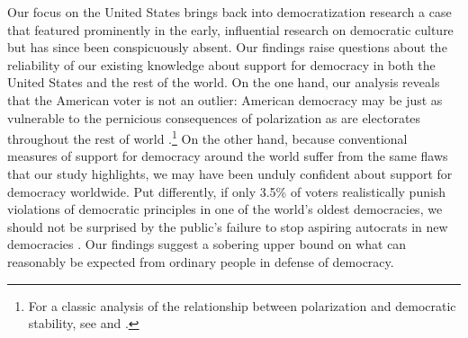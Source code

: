 \documentclass[letterpaper, 12pt]{article}
\begin{document}
\begin{raggedright}
Our focus on the United States brings back into democratization research a case that featured prominently in the early, influential research on democratic culture \citep{Almond1963,Dahl1966} but has since been conspicuously absent. Our findings raise questions about the reliability of our existing knowledge about support for democracy in both the United States and the rest of the world. On the one hand, our analysis reveals that the American voter is not an outlier: American democracy may be just as vulnerable to the pernicious consequences of polarization as are electorates throughout the rest of world \citep{McCoySomer2019,Svolik2019}.\footnote{For a classic analysis of the relationship between polarization and democratic stability, see \citet{Bermeo2003} and \citet{Sartori1976}.} On the other hand, because conventional measures of support for democracy around the world suffer from the same flaws that our study highlights, we may have been unduly confident about support for democracy worldwide. Put differently, if only 3.5\% of voters realistically punish violations of democratic principles in one of the world's oldest democracies, we should not be surprised by the public's failure to stop aspiring autocrats in new democracies \citep{AhlquistIchinoWittenbergEtAl2018,Nalepa2018}. Our findings suggest a sobering upper bound on what can reasonably be expected from ordinary people in defense of democracy.

\clearpage
\singlespacing



\clearpage
\end{raggedright}
\end{document}
